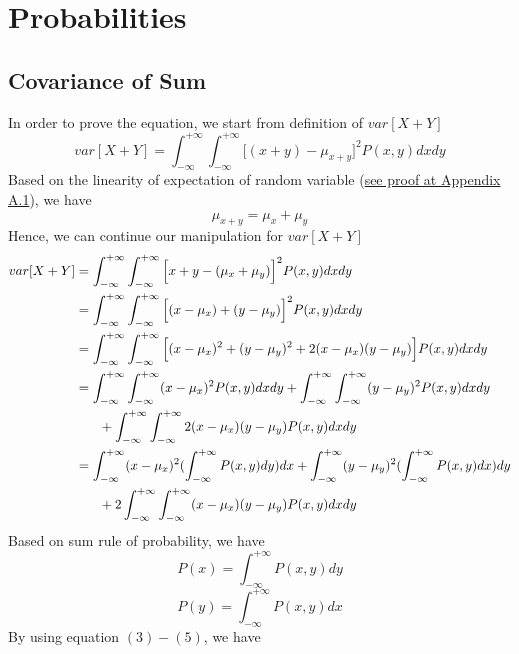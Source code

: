 \documentclass[11pt,a4paper]{article}
\newcommand{\htab}{\hspace*{0.63cm}}
\newcommand{\infint}{\int_{-\infty}^{+\infty}}
\newcommand{\dinfint}{\int_{-\infty}^{+\infty}\int_{-\infty}^{+\infty}}
\begin{document}
\begin{center} \tableofcontents \end{center}
 \newpage
\section{Probabilities}
\subsection{Covariance of Sum}
\htab In order to prove the equation, we start from definition of $var[X+Y]$
    \begin{equation} var[X+Y] = \dinfint \Big[(x+y)- \mu_{x+y} \Big]^{2} P(x,y) dx dy \end{equation}
\htab Based on the linearity of expectation of random variable (\hyperlink{Linearity}{see proof at Appendix A.1}), we have  
    \begin{equation} \mu_{x+y} = \mu_{x} + \mu_{y} \end{equation}
\htab Hence, we can continue our manipulation for $var[X+Y]$
    \begin{equation}
    \begin{aligned}
    var[X+Y] & = \dinfint \Big[x+y- (\mu_{x}+\mu_{y}) \Big]^{2} P(x,y) dx dy \\
             & = \dinfint \Big[ (x-\mu_{x}) + (y -\mu_{y}) \Big]^{2} P(x,y) dx dy \\
    & = \dinfint \Big[ (x-\mu_{x})^{2} + (y-\mu_{y})^{2} + 2(x-\mu_{x})(y-\mu_{y}) \Big] P(x,y) dx dy \\
    & = \dinfint (x-\mu_{x})^{2}P(x,y) dx dy + \dinfint (y-\mu_{y})^{2} P(x,y) dx dy \\ 
    & \htab + \dinfint 2(x-\mu_{x})(y-\mu_{y}) P(x,y) dx dy \\
    & = \infint (x-\mu_{x})^{2} (\infint P(x,y) dy) dx + \infint (y-\mu_{y})^{2} (\infint P(x,y) dx) dy \\
    & \htab + 2\dinfint (x-\mu_{x})(y-\mu_{y}) P(x,y) dx dy 
    \end{aligned}
    \end{equation}
\htab Based on sum rule of probability, we have
    \begin{equation} P(x) = \infint P(x,y) dy  \end{equation}
    \begin{equation} P(y) = \infint P(x,y) dx  \end{equation}
\htab By using equation $(3) - (5)$, we have 
\end{document}
